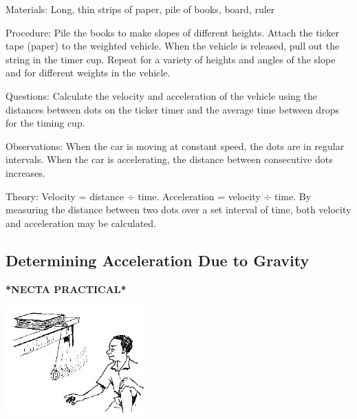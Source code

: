 \begin{multicols}{2}
\begin{description*}
\item[Materials:]{Long, thin strips of paper, pile of books, board, ruler}
\item[Procedure:]{Pile the books to make slopes of different heights. Attach the ticker tape (paper) to the weighted vehicle. When the vehicle is released, pull out the string in the timer cup. Repeat for a variety of heights and angles of the slope and for different weights in the vehicle.}
\item[Questions:]{Calculate the velocity and acceleration of the vehicle using the distances between dots on the ticker timer and the average time between drops for the timing cup.}
\item[Observations:]{When the car is moving at constant speed, the dots are in regular intervals. When the car is accelerating, the distance between consecutive dots increases.}
\item[Theory:]{Velocity = distance $\div$ time. Acceleration = velocity $\div$ time. By measuring the distance between two dots over a set interval of time, both velocity and acceleration may be calculated.}
\end{description*}

\columnbreak

\subsection{Determining Acceleration Due to Gravity}
\textbf{*NECTA PRACTICAL*}

\begin{center}
\includegraphics[width=0.4\textwidth]{./img/source/pendulum-gravity.png}
\end{center}


\end{multicols}
